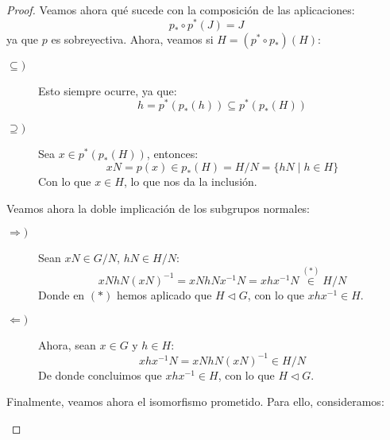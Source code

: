 \begin{teo}
\begin{proof}
        \noindent
        Veamos ahora qué sucede con la composición de las aplicaciones:
        \begin{equation*}
            p_\ast \circ p^\ast(J) = J 
        \end{equation*}
        ya que $p$ es sobreyectiva. Ahora, veamos si $H = (p^\ast\circ p_\ast)(H)$:
        \begin{description}
            \item [$\subseteq)$]  Esto siempre ocurre, ya que:
                \begin{equation*}
                    h = p^\ast(p_\ast(h)) \subseteq p^\ast(p_\ast(H))
                \end{equation*}
            \item [$\supseteq)$] 
                Sea $x\in p^\ast(p_\ast(H))$, entonces:
                \begin{equation*}
                    xN = p(x) \in p_\ast(H) = H/N = \{hN \mid h\in H\}
                \end{equation*}
                Con lo que $x\in H$, lo que nos da la inclusión.
        \end{description}
        Veamos ahora la doble implicación de los subgrupos normales:
        \begin{description}
            \item [$\Longrightarrow)$] Sean $xN\in G/N$, $hN\in H/N$:
                \begin{equation*}
                    xNhN{(xN)}^{-1} = xNhNx^{-1}N = xhx^{-1}N \stackrel{(\ast)}{\in} H/N
                \end{equation*}
                Donde en $(\ast)$ hemos aplicado que $H\lhd G$, con lo que $xhx^{-1}\in H$.
            \item [$\Longleftarrow)$] Ahora, sean $x\in G$ y $h\in H$:
                \begin{equation*}
                    xhx^{-1}N = xN hN {(xN)}^{-1} \in H/N
                \end{equation*}
                De donde concluimos que $xhx^{-1}\in H$, con lo que $H\lhd G$.
        \end{description}

        \noindent
        Finalmente, veamos ahora el isomorfismo prometido. Para ello, consideramos:

        \begin{figure}[H]
            \centering
        \end{figure}


\end{proof}
\end{teo}
